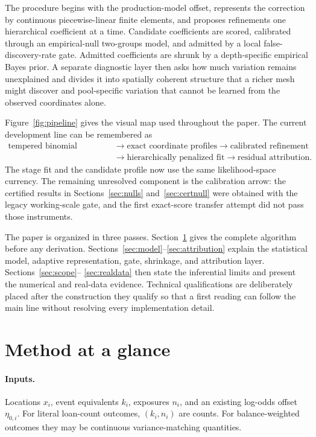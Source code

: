 \documentclass[11pt]{article}
\begin{document}
The procedure begins with the production-model offset, represents the correction by continuous
piecewise-linear finite elements, and proposes refinements one hierarchical coefficient at a time.
Candidate coefficients are scored, calibrated through an empirical-null two-groups model, and admitted
by a local false-discovery-rate gate. Admitted coefficients are shrunk by a depth-specific empirical
Bayes prior. A separate diagnostic layer then asks how much variation remains unexplained and divides
it into spatially coherent structure that a richer mesh might discover and pool-specific variation
that cannot be learned from the observed coordinates alone.

Figure~\ref{fig:pipeline} gives the visual map used throughout the paper. The current
development line can be remembered as
\[
\begin{aligned}
\text{tempered binomial objective}
&\longrightarrow \text{exact coordinate profiles}
\longrightarrow \text{calibrated refinement}\\
&\longrightarrow \text{hierarchically penalized fit}
\longrightarrow \text{residual attribution}.
\end{aligned}
\]
The stage fit and the candidate profile now use the same likelihood-space currency. The
remaining unresolved component is the calibration arrow: the certified results in
Sections~\ref{sec:nulls} and~\ref{sec:certnull} were obtained with the legacy
working-scale gate, and the first exact-score transfer attempt did not pass those
instruments.

The paper is organized in three passes. Section~\ref{sec:overview} gives the complete algorithm before
any derivation. Sections~\ref{sec:model}--\ref{sec:attribution} explain the statistical model,
adaptive representation, gate, shrinkage, and attribution layer. Sections~\ref{sec:scope}--
\ref{sec:realdata} then state the inferential limits and present the numerical and real-data evidence.
Technical qualifications are deliberately placed after the construction they qualify so that a first
reading can follow the main line without resolving every implementation detail.

\section{Method at a glance}\label{sec:overview}

\paragraph{Inputs.} Locations $x_i$, event equivalents $k_i$, exposures $n_i$, and an existing
log-odds offset $\eta_{0,i}$. For literal loan-count outcomes, $(k_i,n_i)$ are counts. For
balance-weighted outcomes they may be continuous variance-matching quantities.
\end{document}
